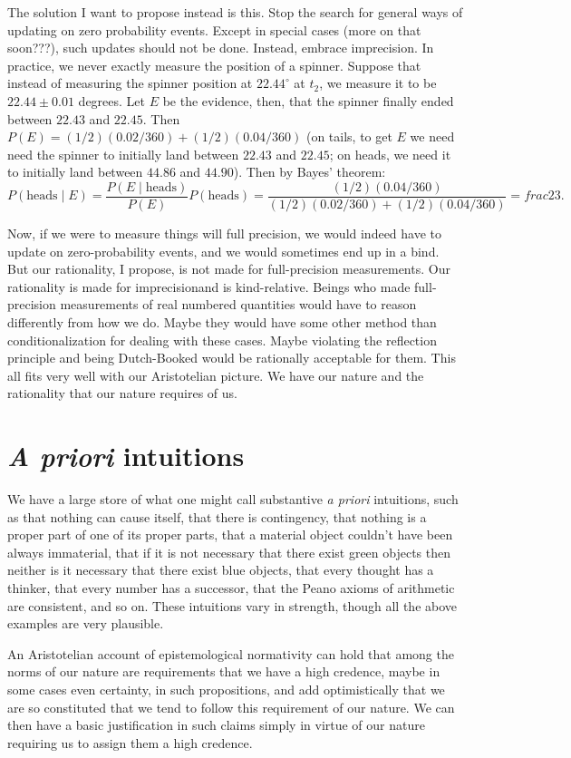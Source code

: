 The solution I want to propose instead is this. Stop the search for general ways of updating on zero probability events. Except in special
cases (more on that soon???), such updates should not be done.  Instead, embrace imprecision. In practice, we never exactly measure the
position of a spinner. Suppose that instead of measuring the spinner position at $22.44^\circ$ at $t_2$, we measure it to be $22.44\pm 0.01$
degrees. Let $E$ be the evidence, then, that the spinner finally ended between $22.43$ and $22.45$. Then $P(E)=(1/2)(0.02/360)+(1/2)(0.04/360)$
(on tails, to get $E$ we need need the spinner to initially land between $22.43$ and $22.45$; on heads, we need it to 
initially land between $44.86$ and $44.90$). Then by Bayes' theorem:
$$
    P(\text{heads} \mid E) = \frac{P(E \mid \text{heads})}{P(E)} P(\text{heads}) = \frac{ (1/2)(0.04/360) }{ (1/2)(0.02/360)+(1/2)(0.04/360) } = 
	frac23.
$$    

Now, if we were to measure things will full precision, we would indeed have to update on zero-probability events, and we would sometimes
end up in a bind. But our rationality, I propose, is not made for full-precision measurements. Our rationality is made for imprecisionand is 
kind-relative. Beings who made full-precision measurements of real numbered quantities would 
have to reason differently from how we do. Maybe they would have some other method than conditionalization for dealing with these cases.
Maybe violating the reflection principle and being Dutch-Booked would be rationally acceptable for them. This all fits very well with 
our Aristotelian picture. We have our nature and the rationality that our nature requires of us.

\section{\textit{A priori} intuitions}
We have a large store of what one might call substantive \textit{a priori} intuitions, such as that nothing can cause itself,
that there is contingency, that nothing is a proper part of one of its proper parts, that a material object couldn't
have been always immaterial, that if it is not necessary that there exist green objects then neither is it necessary 
that there exist blue objects, that every thought has a thinker, that every number has a successor, that the Peano axioms 
of arithmetic are consistent, and so on. These intuitions vary in strength, though all the above examples are very plausible.

An Aristotelian account of epistemological normativity can hold that among the norms of our nature are requirements that we 
have a high credence, maybe in some cases even certainty, in such propositions, and add optimistically that we are so 
constituted that we tend to follow this requirement of our nature. We can then have a basic justification in such claims 
simply in virtue of our nature requiring us to assign them a high credence.

